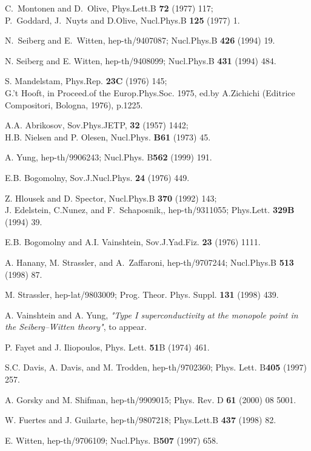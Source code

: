 \documentclass[a4paper,12pt]{article}
\begin{document}
\begin{thebibliography}{99}
  C.~Montonen and D.~Olive, Phys.Lett.B {\bf72}
(1977) 117;\\
P.~Goddard, J.~Nuyts and D.Olive, Nucl.Phys.B {\bf125} (1977) 1.

N.~Seiberg and E.~Witten, hep-th/9407087;
Nucl.Phys.B {\bf426} (1994) 19.

N. Seiberg and E. Witten, hep-th/9408099;
Nucl.Phys.B {\bf431} (1994) 484.

S. Mandelstam, Phys.Rep. {\bf23C} (1976) 145;\\
G.'t Hooft, in Proceed.of the Europ.Phys.Soc. 1975, ed.by
A.Zichichi (Editrice Compositori, Bologna, 1976), p.1225.

A.A. Abrikosov, Sov.Phys.JETP, {\bf32} (1957)
1442;\\
H.B. Nielsen and P. Olesen, Nucl.Phys. {\bf B61} (1973) 45.

 A. Yung, hep-th/9906243; Nucl.Phys. B{\bf562} (1999)
191.

E.B. Bogomolny, Sov.J.Nucl.Phys. {\bf24} (1976) 449.

Z. Hlousek and D. Spector, Nucl.Phys.B {\bf370}
(1992) 143;\\
J. Edelstein, C.Nunez, and F.~Schaposnik,, hep-th/9311055;
Phys.Lett. {\bf329B} (1994) 39.

E.B. Bogomolny and A.I. Vainshtein, Sov.J.Yad.Fiz.
{\bf23} (1976) 1111.

 A. Hanany, M. Strassler, and A.~Zaffaroni,
hep-th/9707244; Nucl.Phys.B {\bf513} (1998) 87.

 M. Strassler, hep-lat/9803009; Prog. Theor. Phys.
Suppl. {\bf131} (1998) 439.

 A. Vainshtein and A. Yung, {\em"Type I
superconductivity at the monopole point in the Seiberg--Witten
theory"}, to appear.

 P. Fayet and J. Iliopoulos, Phys. Lett. {\bf51}B
(1974) 461.

 S.C. Davis, A. Davis, and M. Trodden,
hep-th/9702360; Phys. Lett. B{\bf405} (1997) 257.

 A. Gorsky and M. Shifman, 
 hep-th/9909015; Phys. Rev. D {\bf61} (2000) 08 5001.

W. Fuertes and J. Guilarte,  hep-th/9807218; Phys.Lett.B
{\bf437} (1998) 82.

 E. Witten, hep-th/9706109; Nucl.Phys. B{\bf507}
(1997) 658.


\end{thebibliography}
\end{document}
